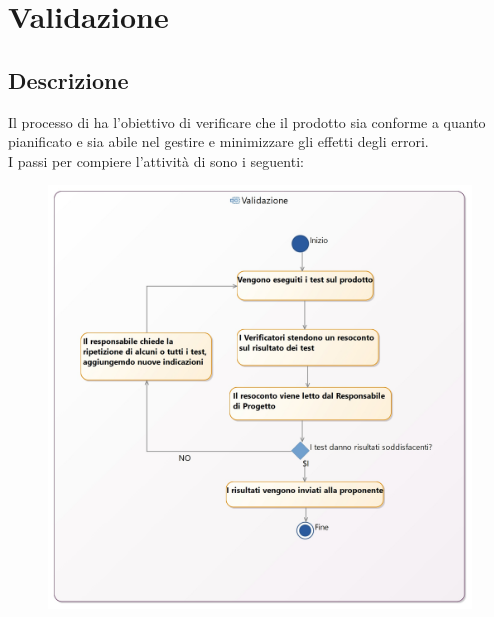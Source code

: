 \documentclass[NormeDiProgetto.tex]{subfiles}
\begin{document}
	\section{Validazione}
	\subsection{Descrizione}
		Il processo di  ha l'obiettivo di verificare che il prodotto sia conforme a quanto pianificato e sia abile nel gestire e minimizzare gli effetti degli errori.\\
		I passi per compiere l'attività di  sono i seguenti:
		\begin{figure}[H]
			\centering
			\includegraphics[width=1\linewidth]{../../common/images/Validation}
		\end{figure}
\end{document}
